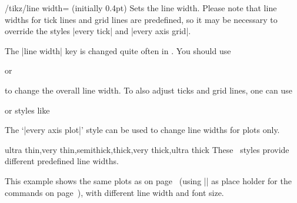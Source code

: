 \begin{key}{/tikz/line width= (initially 0.4pt)}
	Sets the line width. Please note that line widths for tick lines and grid lines are predefined, so it may be necessary to override the styles |every tick| and |every axis grid|.

	The |line width| key is changed quite often in \Tikz. You should use
\begin{codeexample}
\end{codeexample}
	or
\begin{codeexample}
\end{codeexample}
	to change the overall line width. To also adjust ticks and grid lines, one can use
\begin{codeexample}
\end{codeexample}
	or styles like
\begin{codeexample}
\end{codeexample}
	The `|every axis plot|' style can be used to change line widths for plots only.
\end{key}

\begin{keylist}[/tikz]{ultra thin,very thin,semithick,thick,very thick,ultra thick}
	These \Tikz\ styles provide different predefined line widths.
\end{keylist}

This example shows the same plots as on page~\pageref{page:plotcoords:src} (using |\plotcoords| as place holder for the commands on page~\pageref{page:plotcoords:src}), with different line width and font size.
\begin{codeexample}[]
\end{codeexample}

